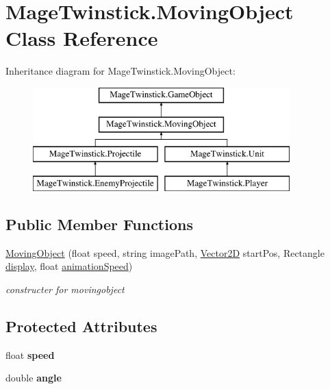 \hypertarget{class_mage_twinstick_1_1_moving_object}{}\section{Mage\+Twinstick.\+Moving\+Object Class Reference}
\label{class_mage_twinstick_1_1_moving_object}
Inheritance diagram for Mage\+Twinstick.\+Moving\+Object\+:\begin{figure}[H]
\begin{center}
\leavevmode
\includegraphics[height=4.000000cm]{class_mage_twinstick_1_1_moving_object}
\end{center}
\end{figure}
\subsection*{Public Member Functions}
\begin{DoxyCompactItemize}
\item 
\hyperlink{class_mage_twinstick_1_1_moving_object_ab600a7d67a921669d7021f9c8b7b9891}{Moving\+Object} (float speed, string image\+Path, \hyperlink{class_mage_twinstick_1_1_vector2_d}{Vector2\+D} start\+Pos, Rectangle \hyperlink{class_mage_twinstick_1_1_game_object_a5807df7f837dc87c8955a008d0b27b50}{display}, float \hyperlink{class_mage_twinstick_1_1_game_object_a5d21c31402c27c5a19f2a62d98720456}{animation\+Speed})
\begin{DoxyCompactList}\small\item\em constructer for movingobject \end{DoxyCompactList}\end{DoxyCompactItemize}
\subsection*{Protected Attributes}
\begin{DoxyCompactItemize}
\item 
\hypertarget{class_mage_twinstick_1_1_moving_object_ac7f09bc1fd21342a3c68b1d25c7e209d}{}float {\bfseries speed}\label{class_mage_twinstick_1_1_moving_object_ac7f09bc1fd21342a3c68b1d25c7e209d}

\item 
\hypertarget{class_mage_twinstick_1_1_moving_object_a93fbd4b287c423a80a525f4e45b93279}{}double {\bfseries angle}\label{class_mage_twinstick_1_1_moving_object_a93fbd4b287c423a80a525f4e45b93279}

\end{DoxyCompactItemize}
